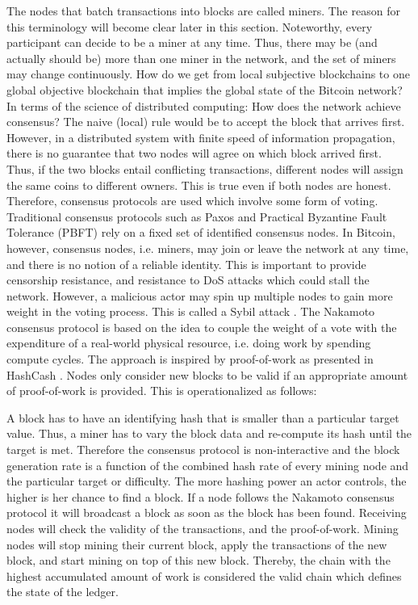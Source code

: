 The nodes that batch transactions into blocks are called miners. The reason for this terminology will become clear later in this section. Noteworthy, every participant can decide to be a miner at any time. Thus, there may be (and actually should be) more than one miner in the network, and the set of miners may change continuously. How do we get from local subjective blockchains to one global objective blockchain that implies the global state of the Bitcoin network? In terms of the science of distributed computing: How does the network achieve consensus? 
The naive (local) rule would be to accept the block that arrives first. However, in a distributed system with finite speed of information propagation, there is no guarantee that two nodes will agree on which block arrived first. Thus, if the two blocks entail conflicting transactions, different nodes will assign the same coins to different owners. This is true even if both nodes are honest. Therefore, consensus protocols are used which involve some form of voting. Traditional consensus protocols such as Paxos \parencite{lamport2001paxos} and Practical Byzantine Fault Tolerance (PBFT) \parencite{castro1999practical} rely on a fixed set of identified consensus nodes. 
 In Bitcoin, however, consensus nodes, i.e. miners, may join or leave the network at any time, and there is no notion of a reliable identity. This is important to provide censorship resistance, and resistance to \ac{DoS} attacks which could stall the network. However, a malicious actor may spin up multiple nodes to gain more weight in the voting process. This is called a Sybil attack \parencite{douceur2002sybil}. The Nakamoto consensus protocol is based on the idea to couple the weight of a vote with the expenditure of a real-world physical resource, i.e. doing work by spending compute cycles. The approach is inspired by proof-of-work as presented in HashCash \parencite{back2002hashcash}. Nodes only consider new blocks to be valid if an appropriate amount of proof-of-work is provided. This is operationalized as follows:

A block has to have an identifying hash that is smaller than a particular target value. Thus, a miner has to vary the block data and re-compute its hash until the target is met. Therefore the consensus protocol is non-interactive and the block generation rate is a function of the combined hash rate of every mining node and the particular target or difficulty. The more hashing power an actor controls, the higher is her chance to find a block. If a node follows the Nakamoto consensus protocol it will broadcast a block as soon as the block has been found. Receiving nodes will check the validity of the transactions, and the proof-of-work. Mining nodes will stop mining their current block, apply the transactions of the new block, and start mining on top of this new block. Thereby, the chain with the highest accumulated amount of work is considered the valid chain which defines the state of the ledger. 

